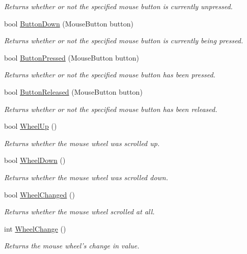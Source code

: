 \begin{DoxyCompactItemize}
\begin{DoxyCompactList}\small\item\em Returns whether or not the specified mouse button is currently unpressed. \end{DoxyCompactList}\item 
bool \hyperlink{interface_tri_devs_1_1_tri_engine2_d_1_1_input_1_1_i_input_manager_a8383fd315905874db04d455211fec203}{Button\-Down} (Mouse\-Button button)
\begin{DoxyCompactList}\small\item\em Returns whether or not the specified mouse button is currently being pressed. \end{DoxyCompactList}\item 
bool \hyperlink{interface_tri_devs_1_1_tri_engine2_d_1_1_input_1_1_i_input_manager_a2b09825487ca4dfccbce5d91ff03bbb1}{Button\-Pressed} (Mouse\-Button button)
\begin{DoxyCompactList}\small\item\em Returns whether or not the specified mouse button has been pressed. \end{DoxyCompactList}\item 
bool \hyperlink{interface_tri_devs_1_1_tri_engine2_d_1_1_input_1_1_i_input_manager_a42249b011c0ba487a2464d2b32e014f5}{Button\-Released} (Mouse\-Button button)
\begin{DoxyCompactList}\small\item\em Returns whether or not the specified mouse button has been released. \end{DoxyCompactList}\item 
bool \hyperlink{interface_tri_devs_1_1_tri_engine2_d_1_1_input_1_1_i_input_manager_ac4c51409fea3e154c0b8f82cd7b2d930}{Wheel\-Up} ()
\begin{DoxyCompactList}\small\item\em Returns whether the mouse wheel was scrolled up. \end{DoxyCompactList}\item 
bool \hyperlink{interface_tri_devs_1_1_tri_engine2_d_1_1_input_1_1_i_input_manager_a44ee1f8e71eb4879734e15bc031f1850}{Wheel\-Down} ()
\begin{DoxyCompactList}\small\item\em Returns whether the mouse wheel was scrolled down. \end{DoxyCompactList}\item 
bool \hyperlink{interface_tri_devs_1_1_tri_engine2_d_1_1_input_1_1_i_input_manager_a422262f2b1887b337459aa6137f24a13}{Wheel\-Changed} ()
\begin{DoxyCompactList}\small\item\em Returns whether the mouse wheel scrolled at all. \end{DoxyCompactList}\item 
int \hyperlink{interface_tri_devs_1_1_tri_engine2_d_1_1_input_1_1_i_input_manager_afbd3f200724d419be432da3a2dc639bd}{Wheel\-Change} ()
\begin{DoxyCompactList}\small\item\em Returns the mouse wheel's change in value. \end{DoxyCompactList}\end{DoxyCompactItemize}
